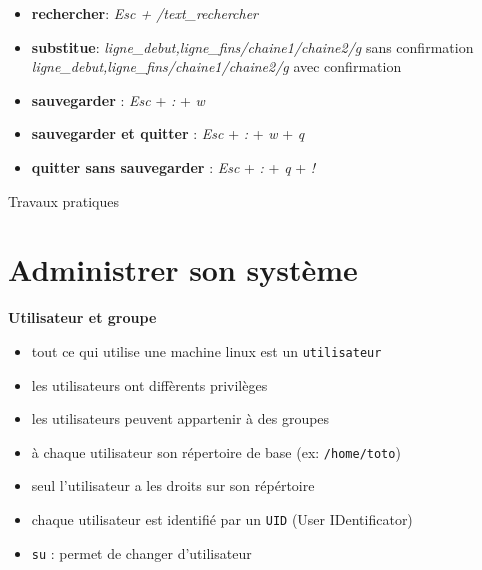 \documentclass[french]{beamer}
\begin{document}
\begin{frame}
    \begin{itemize}
    \item \textbf{rechercher}: \textit{Esc + /text\_rechercher}
    \item \textbf{substitue}:
    \textit{ligne\_debut,ligne\_fins/chaine1/chaine2/g} sans confirmation \\
    \textit{ligne\_debut,ligne\_fins/chaine1/chaine2/g} avec confirmation \\
    \end{itemize}
\end{frame}

\begin{frame}
    \begin{itemize}
    \item \textbf{sauvegarder} : \textit{Esc} + \textit{:} + \textit{w} 
    \item \textbf{sauvegarder et quitter} : \textit{Esc} + \textit{:} +
    \textit{w} + \textit{q} 
    \item \textbf{quitter sans sauvegarder} : \textit{Esc} + \textit{:} +
    \textit{q} + \textit{!} 
    \end{itemize}
\end{frame}

\begin{frame}
\begin{center}
Travaux pratiques
\end{center}
\end{frame}

\section{Administrer son système}
\frame{\tableofcontents[current]}


\begin{frame}
\textbf{Utilisateur et groupe}
    \begin{itemize}
    \item tout ce qui utilise une machine linux est un \texttt{utilisateur}
    \item les utilisateurs ont diffèrents privilèges
    \item les utilisateurs peuvent appartenir à des groupes
    \item à chaque utilisateur son répertoire de base (ex: \texttt{/home/toto})
    \item seul l'utilisateur a les droits sur son répértoire
    \item chaque utilisateur est identifié par un \texttt{UID} (User IDentificator)
    \item \texttt{su} : permet de changer d'utilisateur
    \end{itemize}
\end{frame}
\end{document}
